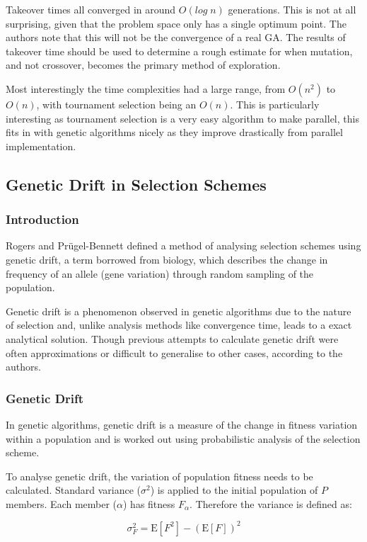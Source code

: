 \documentclass[10pt, a4paper]{article}
\begin{document}
Takeover times all converged in around $O(log\;n)$ generations. This is not at
all surprising, given that the problem space only has a single optimum point.
The authors note that this will not be the convergence of a real GA. The results
of takeover time should be used to determine a rough estimate for when mutation,
and not crossover, becomes the primary method of exploration.

Most interestingly the time complexities had a large range, from $O(n^2)$ to 
$O(n)$, with tournament selection being an $O(n)$. This is particularly 
interesting as tournament selection is a very easy algorithm to make parallel,
this fits in with genetic algorithms nicely as they improve drastically from 
parallel implementation.

\subsection{Genetic Drift in Selection Schemes}
\subsubsection{Introduction} 
Rogers and Pr\"{u}gel-Bennett\cite{Rogers1999Genetic} defined a method of 
analysing selection schemes using genetic drift, a term borrowed from biology,
which describes the change in frequency of an allele (gene variation) through
random sampling of the population.

Genetic drift is a phenomenon observed in genetic algorithms due to the nature
of selection and, unlike analysis methods like convergence time, leads to a
exact analytical solution. Though previous attempts to calculate genetic drift
were often approximations or difficult to generalise to other cases, according
to the authors.

\subsubsection{Genetic Drift} 
In genetic algorithms, genetic drift is a measure of the change in fitness
variation within a population and is worked out using probabilistic analysis of
the selection scheme. 

To analyse genetic drift, the variation of population fitness needs to be
calculated. Standard variance ($\sigma^2$) is applied to the initial population
of $P$ members. Each member ($\alpha$) has fitness $F_\alpha$. Therefore the
variance is defined as:

\begin{equation}
\sigma_F^2 = \text{E}[F^2] - (\text{E}[F])^2
\end{equation}
\end{document}
